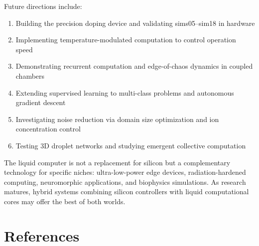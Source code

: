 \documentclass[11pt]{article}
\begin{document}
Future directions include:
\begin{enumerate}
\item Building the precision doping device and validating sims05–sim18 in hardware
\item Implementing temperature-modulated computation to control operation speed
\item Demonstrating recurrent computation and edge-of-chaos dynamics in coupled chambers
\item Extending supervised learning to multi-class problems and autonomous gradient descent
\item Investigating noise reduction via domain size optimization and ion concentration control
\item Testing 3D droplet networks and studying emergent collective computation
\end{enumerate}

The liquid computer is not a replacement for silicon but a complementary technology for specific niches: ultra-low-power edge devices, radiation-hardened computing, neuromorphic applications, and biophysics simulations. As research matures, hybrid systems combining silicon controllers with liquid computational cores may offer the best of both worlds.

\section*{References}
\end{document}
